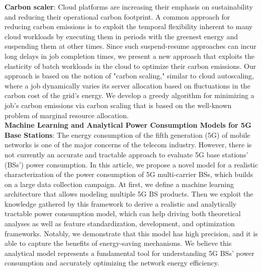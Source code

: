 
\textbf{Carbon scaler}\cite{CarbonScaler}: Cloud platforms are increasing their emphasis on sustainability and reducing their operational carbon footprint. A common approach for reducing carbon emissions is to exploit the temporal flexibility inherent to many cloud workloads by executing them in periods with the greenest energy and suspending them at other times. Since such suspend-resume approaches can incur long delays in job completion times, we present a new approach that exploits the elasticity of batch workloads in the cloud to optimize their carbon emissions. Our approach is based on the notion of "carbon scaling," similar to cloud autoscaling, where a job dynamically varies its server allocation based on fluctuations in the carbon cost of the grid's energy. We develop a greedy algorithm for minimizing a job's carbon emissions via carbon scaling that is based on the well-known problem of marginal resource allocation.
\\

\textbf{Machine Learning and Analytical Power Consumption Models for 5G Base Stations\cite{Piovesan2022}}: The energy consumption of the fifth generation (5G) of mobile networks is one of the major concerns of the telecom industry. However, there is not currently an accurate and tractable approach to evaluate 5G base stations' (BSs') power consumption. In this article, we propose a novel model for a realistic characterization of the power consumption of 5G multi-carrier BSs, which builds on a large data collection campaign. At first, we define a machine learning architecture that allows modeling multiple 5G BS products. Then we exploit the knowledge gathered by this framework to derive a realistic and analytically tractable power consumption model, which can help driving both theoretical analyses as well as feature standardization, development, and optimization frameworks. Notably, we demonstrate that this model has high precision, and it is able to capture the benefits of energy-saving mechanisms. We believe this analytical model represents a fundamental tool for understanding 5G BSs' power consumption and accurately optimizing the network energy efficiency.\\

